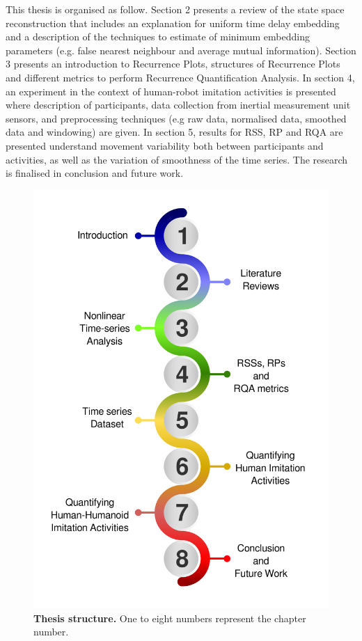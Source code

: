 This thesis is organised as follow. 
Section 2 presents a review of the state space reconstruction 
that includes an explanation for uniform time delay embedding and a 
description of the techniques to estimate of minimum embedding 
parameters (e.g. false nearest neighbour and average mutual information).
Section 3 presents an introduction to Recurrence Plots,
structures of Recurrence Plots and different metrics to perform Recurrence Quantification Analysis.
In section 4, an experiment in the context of human-robot imitation
activities is presented where description of participants, data collection from inertial measurement unit sensors,
and preprocessing techniques (e.g raw data, normalised data, smoothed data and windowing)
are given.
In section 5, results for RSS, RP and RQA are presented understand 
movement variability both between participants and activities, 
as well as the variation of smoothness of the time series.
The research is finalised in conclusion and future work.



\begin{figure}
\centering
\includegraphics[width=1.0\textwidth]{thesis-structure-v01}
    \caption{
	{\bf Thesis structure.}
	One to eight numbers represent the chapter number.   
	  }
    \label{fig:ts}
\end{figure}





